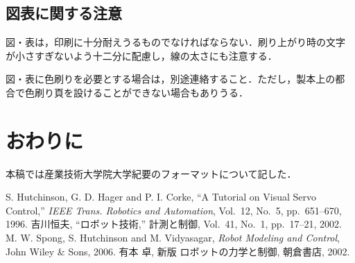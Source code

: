 \documentclass[a4j, 12Q, twocolumn, twoside]{jsarticle}
\begin{document}
\subsection{図表に関する注意}
図・表は，印刷に十分耐えうるものでなければならない．刷り上がり時の文字
が小さすぎないよう十二分に配慮し，線の太さにも注意する．

図・表に色刷りを必要とする場合は，別途連絡すること．ただし，製本上の都
合で色刷り頁を設けることができない場合もありうる．

\section{おわりに}
本稿では産業技術大学院大学紀要のフォーマットについて記した．

\begin{thebibliography}{99}
S. Hutchinson, G. D. Hager and P. I. Corke,
``A Tutorial on Visual Servo Control,''
{\it IEEE Trans. Robotics and Automation},
Vol.~12, No.~5, pp.~651--670, 1996.
%
吉川恒夫,
``ロボット技術,''
計測と制御, Vol.~41, No.~1, pp.~17--21, 2002.
%
M. W. Spong, S. Hutchinson and M. Vidyasagar, 
{\it Robot Modeling and Control}, 
John Wiley \& Sons, 2006. 
%
有本 卓, 新版 ロボットの力学と制御, 朝倉書店, 2002. 
\end{thebibliography}
\end{document}
